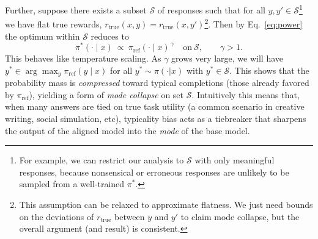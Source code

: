 Further, suppose there exists a subset $\mathcal{S}$ of responses such that for all $y,y'\!\in\!\mathcal{S}$\footnote{For example, we can restrict our analysis to $\mathcal{S}$ with only meaningful responses, because nonsensical or erroneous responses are unlikely to be sampled from a well-trained $\pi^*$. 
} we have 
flat true rewards, $r_{\text{true}}(x,y)=r_{\text{true}}(x,y')$\footnote{This assumption can be relaxed to approximate flatness. We just need bounds on the deviations of $r_{\mathrm{\text{true}}}$ between $y$ and $y'$ to claim mode collapse, but the overall argument (and result) is consistent. 
}. %
Then by Eq.~\ref{eq:power} the optimum within $\mathcal{S}$ reduces to
\[
\pi^*(\cdot\mid x)\ \propto\ \pi_{\mathrm{ref}}(\cdot\mid x)^{\,\gamma}\quad\text{on}\ \mathcal{S},
\qquad \gamma>1.
\]
This behaves like temperature scaling. As $\gamma$ grows very large, we will have $y^* \in \arg\max_y \pi_\text{ref}(y \mid x)$ for all $y^* \sim \pi(\cdot | x)$ with $y^* \in \mathcal{S}$.
This shows that the probability mass is \emph{compressed} toward typical completions (those already favored by $\pi_{\mathrm{ref}}$), yielding a form of \emph{mode collapse} on set $\mathcal{S}$. %
Intuitively this means that, when many answers are tied on true task utility (a common scenario in creative writing, social simulation, etc), typicality bias acts as a tiebreaker that sharpens the output of the aligned model into the \textit{mode} of the base model. %






